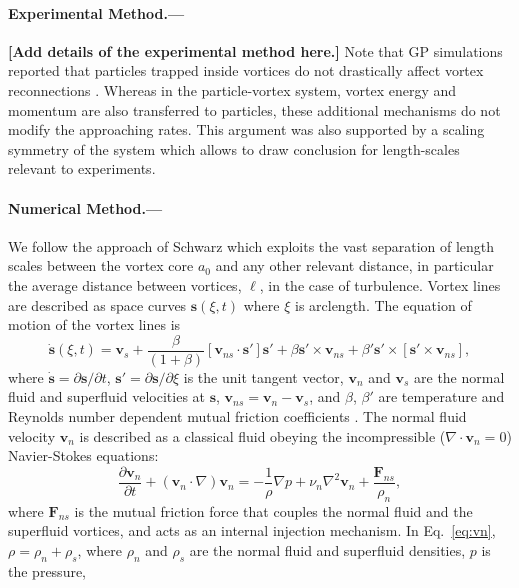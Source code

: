\documentclass[%
 reprint,
 amsmath,amssymb,
 aps,
 prl,
]{revtex4-2}
\def \s{\mathbf{s}}
\def \v{\mathbf{v}}
\newcommand*{\NOTE}[1]{\textbf{\color{red}[#1]}}
\begin{document}
\paragraph*{Experimental Method.---} \NOTE{Add details of the experimental method here.} Note that GP simulations reported that particles trapped inside vortices do not drastically affect vortex reconnections \cite{GiuriatoQuantumVortexReconnections2020}. Whereas in the particle-vortex system, vortex energy and momentum are also transferred to particles, these additional mechanisms do not modify the approaching rates. This argument was also supported by a scaling symmetry of the system which allows to draw conclusion for length-scales relevant to experiments. 

\paragraph*{Numerical Method.---}We follow the approach of Schwarz \cite{schwarz1988} which exploits
the vast separation of length scales between the vortex core $a_0$ and any
other relevant distance, in particular the average distance between vortices,
$\ell$, in the case of turbulence. Vortex lines are described
as space curves $\s(\xi,t)$ where $\xi$ is arclength. The equation of motion 
of the vortex lines is
\begin{equation}
\label{eq:s}
	\dot{\s}(\xi,t) = \v_s + \frac{\beta}{(1+\beta)}\left[\v_{ns}\cdot \s'\right]\s' + \beta\s'\times\v_{ns}+\beta'\s'\times\left[\s'\times \v_{ns}\right],
\end{equation}
%
where $\dot{\s}=\partial\s/\partial t$, $\s'=\partial\s/\partial \xi$ 
is the unit tangent vector, 
$\v_n$ and $\v_s$ are the normal fluid and superfluid velocities at $\s$,
$\v_{ns}=\v_n - \v_s$, and $\beta$, $\beta'$ are temperature and Reynolds number dependent 
mutual friction coefficients \cite{galantucciNewSelfconsistentApproach2020b}. The normal fluid velocity $\v_n$ is described as a classical fluid obeying the incompressible ($\nabla\cdot\v_n=0$) Navier-Stokes equations:
%
\begin{equation}
\label{eq:vn}
	\frac{\partial \v_n}{\partial t} + (\v_n\cdot\nabla)\v_n = 
        -\frac{1}{\rho} \nabla p + \nu_n\nabla^2\v_n + \frac{\mathbf{F}_{ns}}{\rho_n},
\end{equation}
where $\mathbf{F}_{ns}$ is the mutual friction force that couples the normal fluid and the superfluid vortices, and acts as an internal injection mechanism. In Eq.~\eqref{eq:vn}, $\rho=\rho_n + \rho_s$, where $\rho_n$ and $\rho_s$ are the normal fluid and superfluid densities, $p$ is the pressure, 
\end{document}
